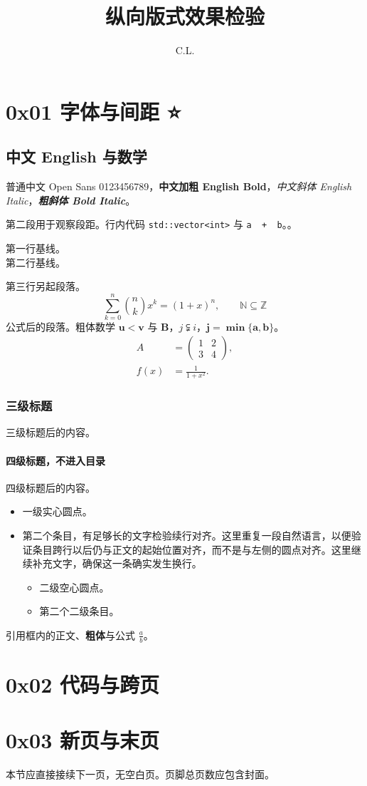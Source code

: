\documentclass{article}
\title{纵向版式效果检验}
\author{C.L.}
\date{}
\begin{document}
\maketitle
\tableofcontents
\section{0x01 字体与间距 ⭐ 🚩}
\subsection{中文 English 与数学}
普通中文 Open Sans 0123456789，\textbf{中文加粗 English Bold}，\emph{中文斜体 English Italic}，\textbf{\emph{粗斜体 Bold Italic}}。

第二段用于观察段距。行内代码 \texttt{std::vector<int>} 与 \verb|a  +  b|。。

\noindent 第一行基线。\\第二行基线。

第三行另起段落。
\[
\sum_{k=0}^n\binom nk x^k=(1+x)^n,\qquad \mathbb{N}\subseteq\mathbb{Z}
\]
公式后的段落。粗体数学 $\boldsymbol{u<v}$ 与 $\mathbf{B}$，$j\subsetneqq i$，$\boldsymbol{j=\min\{a,b\}}$。
\begin{align*}
 A&=\begin{pmatrix}1&2\\3&4\end{pmatrix},\\
 f(x)&=\frac{1}{1+x^2}.
\end{align*}
\subsubsection{三级标题}
三级标题后的内容。
\paragraph{四级标题，不进入目录}
四级标题后的内容。
\begin{itemize}
\item 一级实心圆点。
\item 第二个条目，有足够长的文字检验续行对齐。这里重复一段自然语言，以便验证条目跨行以后仍与正文的起始位置对齐，而不是与左侧的圆点对齐。这里继续补充文字，确保这一条确实发生换行。
\begin{itemize}
\item 二级空心圆点。
\item 第二个二级条目。
\end{itemize}
\end{itemize}
\begin{quoteblock}引用框内的正文、\textbf{粗体}与公式 $\frac ab$。\end{quoteblock}
\Separator{}
\section{0x02 代码与跨页}

\section{0x03 新页与末页}
本节应直接接续下一页，无空白页。页脚总页数应包含封面。
\end{document}
